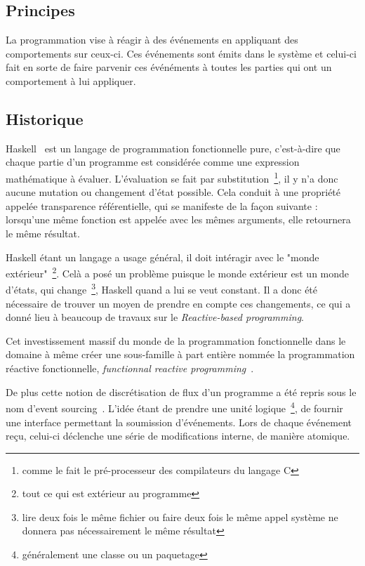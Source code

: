 \documentclass{article}
\begin{document}
\subsection{Principes}\label{principes-1}

La programmation vise à réagir à des événements en appliquant des
comportements sur ceux-ci. Ces événements sont émits dans le système et celui-ci
fait en sorte de faire parvenir ces événéments à toutes les parties qui ont un comportement
à lui appliquer.

\subsection{Historique}\label{historique-1}

Haskell~\cite{haskell} est un langage de programmation fonctionnelle pure, c'est-à-dire
que chaque partie d'un programme est considérée comme une expression mathématique
à évaluer. L'évaluation se fait par substitution~\footnote{comme le fait le pré-processeur
des compilateurs du langage C}, il y n'a donc aucune mutation ou changement d'état
possible. Cela conduit à une propriété appelée transparence référentielle, qui se
manifeste de la façon suivante : lorsqu'une même fonction est appelée avec les mêmes
arguments, elle retournera le même résultat.

Haskell étant un langage a usage général, il doit intéragir avec le "monde extérieur"~\footnote{tout ce qui est extérieur au programme}.
Celà a posé un problème puisque le monde extérieur est un monde d'états, qui change~\footnote{lire deux fois le même fichier ou faire deux fois le même appel système ne donnera pas nécessairement le même résultat},
Haskell quand a lui se veut constant.
Il a donc été nécessaire de trouver un moyen de prendre en compte ces changements,
ce qui a donné lieu à beaucoup de travaux sur le \emph{Reactive-based programming}.

Cet investissement massif du monde de la programmation fonctionnelle
dans le domaine à même créer une sous-famille à part entière nommée la
programmation réactive fonctionnelle, \emph{functionnal reactive programming}~\cite{frp}.

De plus cette notion de discrétisation de flux d'un programme a été repris
sous le nom d'event sourcing~\cite{eventsourcing}. 
L'idée étant de prendre une unité logique~\footnote{généralement une classe ou un paquetage},
de fournir une interface permettant la soumission d'événements. Lors de chaque événement
reçu, celui-ci déclenche une série de modifications interne, de manière atomique.
\end{document}

